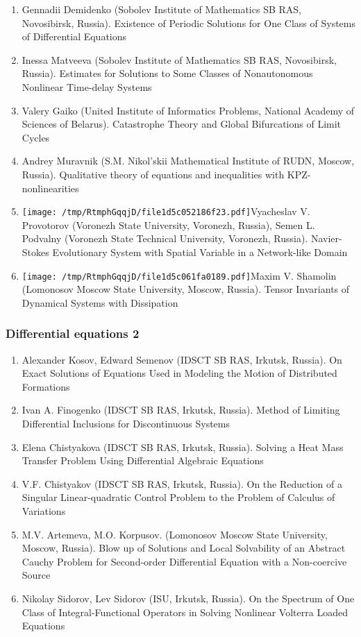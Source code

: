 \documentclass[
]{article}
\providecommand{\tightlist}{%
  \setlength{\itemsep}{0pt}\setlength{\parskip}{0pt}}
\begin{document}
\begin{enumerate}
\def\labelenumi{\arabic{enumi}.}
\tightlist
\item
  Gennadii Demidenko (Sobolev Institute of Mathematics SB RAS,
  Novosibirsk, Russia). Existence of Periodic Solutions for One Class of
  Systems of Differential Equations
\item
  Inessa Matveeva (Sobolev Institute of Mathematics SB RAS, Novosibirsk,
  Russia). Estimates for Solutions to Some Classes of Nonautonomous
  Nonlinear Time-delay Systems
\item
  Valery Gaiko (United Institute of Informatics Problems, National
  Academy of Sciences of Belarus). Catastrophe Theory and Global
  Bifurcations of Limit Cycles
\item
  Andrey Muravnik (S.M. Nikol'skii Mathematical Institute of RUDN,
  Moscow, Russia). Qualitative theory of equations and inequalities with
  KPZ-nonlinearities
\item
  \protect\texttt{[image: /tmp/RtmphGqqjD/file1d5c052186f23.pdf]}Vyacheslav
  V. Provotorov (Voronezh State University, Voronezh, Russia), Semen L.
  Podvalny (Voronezh State Technical University, Voronezh, Russia).
  Navier-Stokes Evolutionary System with Spatial Variable in a
  Network-like Domain
\item
  \protect\texttt{[image: /tmp/RtmphGqqjD/file1d5c061fa0189.pdf]}Maxim
  V. Shamolin (Lomonosov Moscow State University, Moscow, Russia).
  Tensor Invariants of Dynamical Systems with Dissipation
\end{enumerate}

\hypertarget{de2}{%
\subsubsection{Differential equations 2}\label{de2}}

\begin{enumerate}
\def\labelenumi{\arabic{enumi}.}
\tightlist
\item
  Alexander Kosov, Edward Semenov (IDSCT SB RAS, Irkutsk, Russia). On
  Exact Solutions of Equations Used in Modeling the Motion of
  Distributed Formations
\item
  Ivan A. Finogenko (IDSCT SB RAS, Irkutsk, Russia). Method of Limiting
  Differential Inclusions for Discontinuous Systems
\item
  Elena Chistyakova (IDSCT SB RAS, Irkutsk, Russia). Solving a Heat Mass
  Transfer Problem Using Differential Algebraic Equations
\item
  V.F. Chistyakov (IDSCT SB RAS, Irkutsk, Russia). On the Reduction of a
  Singular Linear-quadratic Control Problem to the Problem of Calculus
  of Variations
\item
  M.V. Artemeva, M.O. Korpusov. (Lomonosov Moscow State University,
  Moscow, Russia). Blow up of Solutions and Local Solvability of an
  Abstract Cauchy Problem for Second-order Differential Equation with a
  Non-coercive Source
\item
  Nikolay Sidorov, Lev Sidorov (ISU, Irkutsk, Russia). On the Spectrum
  of One Class of Integral-Functional Operators in Solving Nonlinear
  Volterra Loaded Equations
\end{enumerate}
\end{document}
